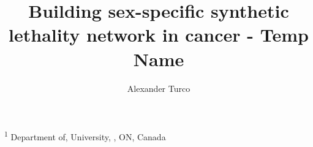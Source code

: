\documentclass[10pt]{article}
\title{\sc Building sex-specific synthetic lethality network in cancer - Temp Name}
\author{\sc Alexander Turco}
\begin{document}

\onecolumn
                        \maketitle

\thispagestyle{empty}
\noindent \textsuperscript{1} Department of, University, , ON, Canada

\newpage
\newpage
       






\end{document}
